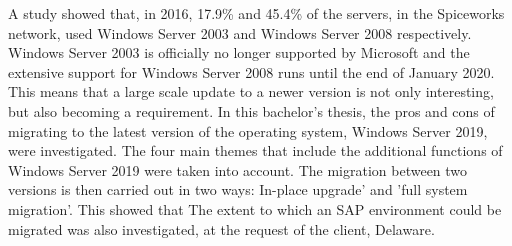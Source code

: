 A study \autocite{Tsai2016} showed that, in 2016, 17.9\% and 45.4\% of the servers, in the Spiceworks network, used Windows Server 2003 and Windows Server 2008 respectively. Windows Server 2003 is officially no longer supported by Microsoft and the extensive support for Windows Server 2008 runs until the end of January 2020. This means that a large scale update to a newer version is not only interesting, but also becoming a requirement. In this bachelor's thesis, the pros and cons of migrating to the latest version of the operating system, Windows Server 2019, were investigated. The four main themes that include the additional functions of Windows Server 2019 were taken into account. The migration between  two versions is then carried out in two ways: In-place upgrade' and 'full system migration'. 
This showed that %
The extent to which an SAP environment could be migrated was also investigated, at the request of the client, Delaware. %

